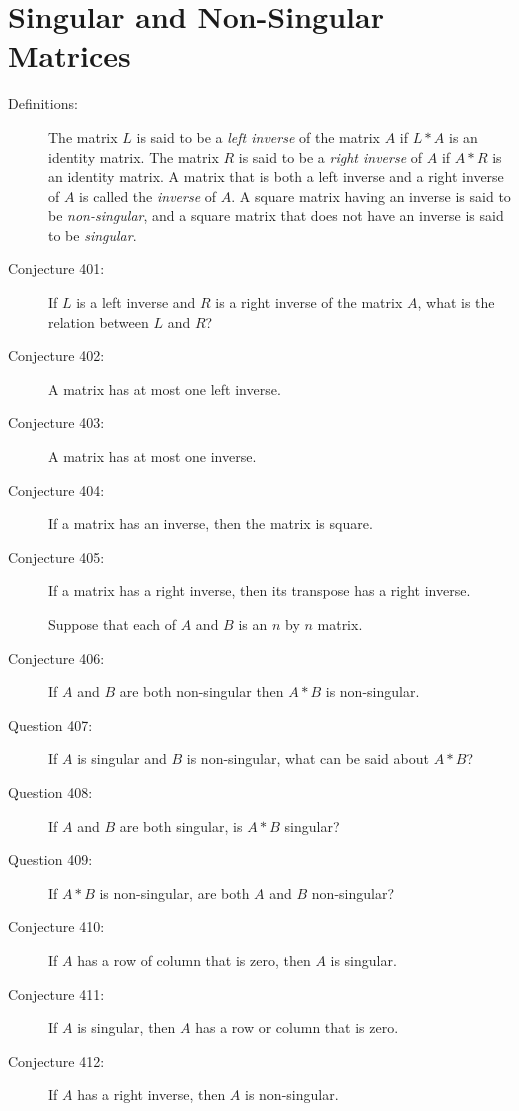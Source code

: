 \documentclass{article}
\begin{document}
\section{Singular and Non-Singular Matrices}

\begin{description}

  \item[Definitions:] The matrix $L$ is said to be a \emph{left inverse} of the matrix $A$ if $L*A$ is an identity matrix. The matrix $R$ is said to be a \emph{right inverse} of $A$ if $A*R$ is an identity matrix. A matrix that is both a left inverse and a right inverse of $A$ is called the \emph{inverse} of $A$. A square matrix having an inverse is said to be \emph{non-singular}, and a square matrix that does not have an inverse is said to be \emph{singular}.

  \item[Conjecture 401:] If $L$ is a left inverse and $R$ is a right inverse of the matrix $A$, what is the relation between $L$ and $R$?

  \item[Conjecture 402:] A matrix has at most one left inverse.

  \item[Conjecture 403:] A matrix has at most one inverse.

  \item[Conjecture 404:] If a matrix has an inverse, then the matrix is square.

  \item[Conjecture 405:] If a matrix has a right inverse, then its transpose has a right inverse.

  \item[] Suppose that each of $A$ and $B$ is an $n$ by $n$ matrix.

  \item[Conjecture 406:] If $A$ and $B$ are both non-singular then $A*B$ is non-singular.

  \item[Question 407:] If $A$ is singular and $B$ is non-singular, what can be said about $A*B$?

  \item[Question 408:] If $A$ and $B$ are both singular, is $A*B$ singular?

  \item[Question 409:] If $A*B$ is non-singular, are both $A$ and $B$ non-singular?

  \item[Conjecture 410:] If $A$ has a row of column that is zero, then $A$ is singular.

  \item[Conjecture 411:] If $A$ is singular, then $A$ has a row or column that is zero.

  \item[Conjecture 412:] If $A$ has a right inverse, then $A$ is non-singular.

\end{description}
\end{document}
